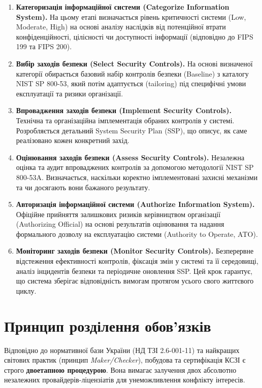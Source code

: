 \begin{enumerate}
    \item \textbf{Категоризація інформаційної системи (Categorize Information System).} На цьому етапі визначається рівень критичності системи (Low, Moderate, High) на основі аналізу наслідків від потенційної втрати конфіденційності, цілісності чи доступності інформації (відповідно до FIPS 199 та FIPS 200).
    \item \textbf{Вибір заходів безпеки (Select Security Controls).} На основі визначеної категорії обирається базовий набір контролів безпеки (Baseline) з каталогу NIST SP 800-53, який потім адаптується (tailoring) під специфічні умови експлуатації та ризики організації.
    \item \textbf{Впровадження заходів безпеки (Implement Security Controls).} Технічна та організаційна імплементація обраних контролів у системі. Розробляється детальний System Security Plan (SSP), що описує, як саме реалізовано кожен конкретний захід.
    \item \textbf{Оцінювання заходів безпеки (Assess Security Controls).} Незалежна оцінка та аудит впроваджених контролів за допомогою методології NIST SP 800-53A. Визначається, наскільки коректно імплементовані захисні механізми та чи досягають вони бажаного результату.
    \item \textbf{Авторизація інформаційної системи (Authorize Information System).} Офіційне прийняття залишкових ризиків керівництвом організації (Authorizing Official) на основі результатів оцінювання та надання формального дозволу на експлуатацію системи (Authority to Operate, ATO).
    \item \textbf{Моніторинг заходів безпеки (Monitor Security Controls).} Безперервне відстеження ефективності контролів, фіксація змін у системі та її середовищі, аналіз інцидентів безпеки та періодичне оновлення SSP. Цей крок гарантує, що система зберігає відповідність вимогам протягом усього свого життєвого циклу.
\end{enumerate}

\section{Принцип розділення обов'язків}


Відповідно до нормативної бази України (НД ТЗІ 2.6-001-11) та найкращих світових практик
(принцип \emph{Maker/Checker}), побудова та сертифікація КСЗІ є строго \textbf{двоетапною
процедурою}. Вона вимагає залучення двох абсолютно незалежних провайдерів-ліцензіатів для
унеможливлення конфлікту інтересів.

